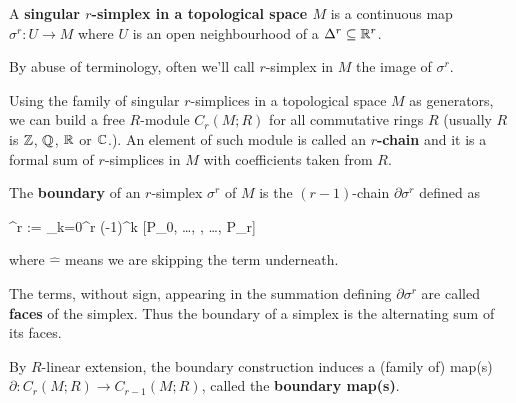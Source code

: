 \documentclass[main.tex]{subfiles}
\begin{document}
\begin{figure}[H]
	\centering
\end{figure}

\begin{definition}
	A \textbf{singular $r$-simplex in a topological space $M$} is a continuous map $\sigma^r : U \to M$ where $U$ is an open neighbourhood of a $\Delta^r \subseteq \mathbb{R}^r$.
\end{definition}

By abuse of terminology, often we'll call $r$-simplex in $M$ the image of $\sigma^r$.

\begin{construction}
	Using the family of singular $r$-simplices in a topological space $M$ as generators, we can build a free $R$-module $C_r(M; R)$ for all commutative rings $R$ (usually $R$ is $\mathbb{Z}$, $\mathbb{Q}$, $\mathbb{R}$ or $\mathbb{C}$.). An element of such module is called an \textbf{$r$-chain} and it is a formal sum of $r$-simplices in $M$ with coefficients taken from $R$.
\end{construction}

\begin{definition}
	The \textbf{boundary} of an $r$-simplex $\sigma^r$ of $M$ is the $(r-1)$-chain $\partial \sigma^r$ defined as
	\begin{eqalign}
		\partial \sigma^r := \sum_{k=0}^r (-1)^k [P_0, \ldots, , \ldots, P_r]
	\end{eqalign}
	where $\hat{-}$ means we are skipping the term underneath.
\end{definition}

The terms, without sign, appearing in the summation defining $\partial \sigma^r$ are called \textbf{faces} of the simplex. Thus the boundary of a simplex is the alternating sum of its faces.

By $R$-linear extension, the boundary construction induces a (family of) map(s) $\partial : C_r(M; R) \to C_{r-1}(M; R)$, called the \textbf{boundary map(s)}.
\end{document}
